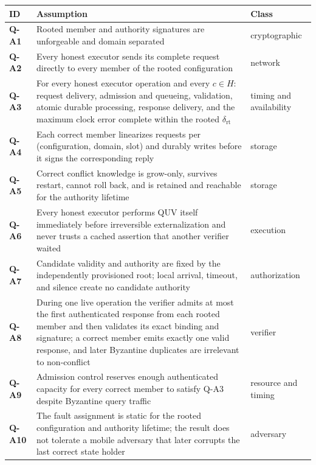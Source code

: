 \documentclass[11pt]{article}
\begin{document}
\begin{center}
\small
\begin{tabularx}{\textwidth}{>{\raggedright\arraybackslash}p{} X >{\raggedright\arraybackslash}p{}}
\toprule
\textbf{ID} & \textbf{Assumption} & \textbf{Class} \\
\midrule
\textbf{Q-A1} & Rooted member and authority signatures are unforgeable and domain separated & cryptographic \\
\textbf{Q-A2} & Every honest executor sends its complete request directly to every member of the rooted configuration & network \\
\textbf{Q-A3} & For every honest executor operation and every \(c \in H\): request delivery, admission and queueing, validation, atomic durable processing, response delivery, and the maximum clock error complete within the rooted \(\delta_{\mathrm{rt}}\) & timing and availability \\
\textbf{Q-A4} & Each correct member linearizes requests per (configuration, domain, slot) and durably writes before it signs the corresponding reply & storage \\
\textbf{Q-A5} & Correct conflict knowledge is grow-only, survives restart, cannot roll back, and is retained and reachable for the authority lifetime & storage \\
\textbf{Q-A6} & Every honest executor performs QUV itself immediately before irreversible externalization and never trusts a cached assertion that another verifier waited & execution \\
\textbf{Q-A7} & Candidate validity and authority are fixed by the independently provisioned root; local arrival, timeout, and silence create no candidate authority & authorization \\
\textbf{Q-A8} & During one live operation the verifier admits at most the first authenticated response from each rooted member and then validates its exact binding and signature; a correct member emits exactly one valid response, and later Byzantine duplicates are irrelevant to non-conflict & verifier \\
\textbf{Q-A9} & Admission control reserves enough authenticated capacity for every correct member to satisfy Q-A3 despite Byzantine query traffic & resource and timing \\
\textbf{Q-A10} & The fault assignment is static for the rooted configuration and authority lifetime; the result does not tolerate a mobile adversary that later corrupts the last correct state holder & adversary \\
\bottomrule
\end{tabularx}
\end{center}
\end{document}
